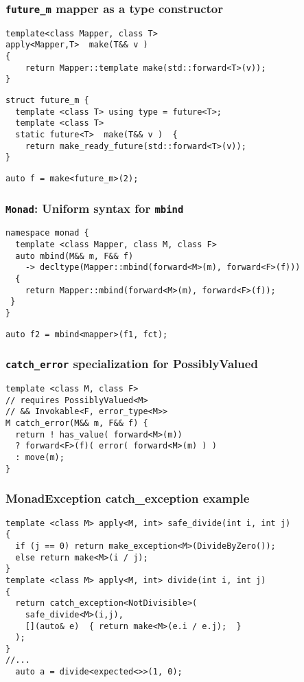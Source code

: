 \documentclass[xcolor=dvipsnames]{beamer}
\newcommand{\cpp}[1]{\lstinline{#1}}
\begin{document}
\begin{frame}[fragile]
\frametitle{\cpp{future_m} mapper as a type constructor}

\begin{lstlisting}
template<class Mapper, class T>
apply<Mapper,T>  make(T&& v )  
{
    return Mapper::template make(std::forward<T>(v));
}
\end{lstlisting}
\begin{lstlisting}
struct future_m {
  template <class T> using type = future<T>;
  template <class T> 
  static future<T>  make(T&& v )  {
    return make_ready_future(std::forward<T>(v));
}
\end{lstlisting}
\begin{lstlisting}
auto f = make<future_m>(2); 
\end{lstlisting}

\end{frame}
\begin{frame}[fragile]
\frametitle{\cpp{Monad}: Uniform syntax for \cpp{mbind}}

\begin{lstlisting}
namespace monad {
  template <class Mapper, class M, class F>
  auto mbind(M&& m, F&& f)
    -> decltype(Mapper::mbind(forward<M>(m), forward<F>(f)))
  {
    return Mapper::mbind(forward<M>(m), forward<F>(f));
 }
}
\end{lstlisting}

\begin{lstlisting}
auto f2 = mbind<mapper>(f1, fct); 
\end{lstlisting}

\end{frame}
\begin{frame}[fragile]
\frametitle{\cpp{catch_error} specialization for PossiblyValued}
       
\begin{lstlisting}
template <class M, class F>
// requires PossiblyValued<M> 
// && Invokable<F, error_type<M>>
M catch_error(M&& m, F&& f) {
  return ! has_value( forward<M>(m))
  ? forward<F>(f)( error( forward<M>(m) ) )
  : move(m);
}
\end{lstlisting}
         
\end{frame}
\begin{frame}[fragile]
\frametitle{MonadException catch\_exception example}

\begin{lstlisting}
template <class M> apply<M, int> safe_divide(int i, int j)  
{
  if (j == 0) return make_exception<M>(DivideByZero());
  else return make<M>(i / j);
}
template <class M> apply<M, int> divide(int i, int j)  
{
  return catch_exception<NotDivisible>(
    safe_divide<M>(i,j), 
    [](auto& e)  { return make<M>(e.i / e.j);  }
  );
}
//...
  auto a = divide<expected<>>(1, 0);
\end{lstlisting}
\end{frame}
\end{document}
